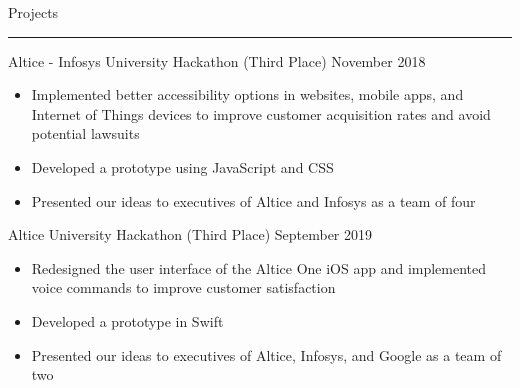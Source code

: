 \documentclass{article}
\newcommand \spacingBetweenHeadings {0.5em}
\begin{document}
\vspace{\spacingBetweenHeadings}

\noindent
\huge Projects\par
\vspace{0.1em}
\hrule
\Large
\vspace{1em}
\noindent
Altice - Infosys University Hackathon (Third Place)
\hfill
November 2018\\
\vspace{-1em}
\begin{itemize}
\item Implemented better accessibility options in websites, mobile apps, and Internet of Things devices to improve customer acquisition rates and avoid potential lawsuits
\item Developed a prototype using JavaScript and CSS
\item Presented our ideas to executives of Altice and Infosys as a team of four
\end{itemize}

\noindent
Altice University Hackathon (Third Place)
\hfill
September 2019\\
\vspace{-1em}
\begin{itemize}
\item Redesigned the user interface of the Altice One iOS app and implemented voice commands to improve customer satisfaction
\item Developed a prototype in Swift
\item Presented our ideas to executives of Altice, Infosys, and Google as a team of two
\end{itemize}
\end{document}
